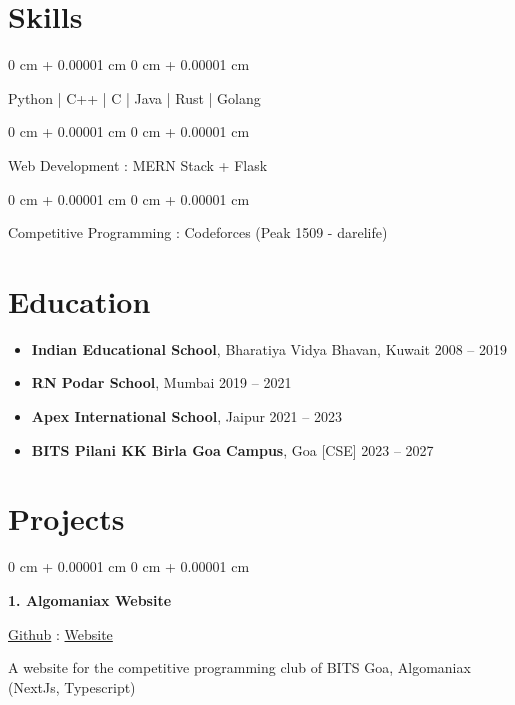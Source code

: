 \documentclass[10pt, letterpaper]{article}
\newenvironment{onecolentry}{
    \begin{adjustwidth}{
        0 cm + 0.00001 cm
    }{
        0 cm + 0.00001 cm
    }
}{
    \end{adjustwidth}
}
\newenvironment{twocolentry}[2][]{
    \onecolentry
    \def\secondColumn{#2}
    \setcolumnwidth{\fill, 4.7 cm} %
    \begin{paracol}{2}
}{
    \switchcolumn \raggedleft \secondColumn
    \end{paracol}
    \endonecolentry
}
\begin{document}
    \section{Skills}
        \begin{onecolentry}
            Python | C++ | C | Java | Rust | Golang
        \end{onecolentry}
        \vspace{0.15cm} %
        \begin{onecolentry}
            Web Development : MERN Stack + Flask
        \end{onecolentry}
        \vspace{0.15cm} %
        \begin{onecolentry}
            Competitive Programming : Codeforces (Peak 1509 - darelife)
        \end{onecolentry}

    \section{Education}
        \begin{itemize}[itemsep=0.2cm] %
            \item \textbf{Indian Educational School}, Bharatiya Vidya Bhavan, Kuwait \hfill 2008 -- 2019
            \item \textbf{RN Podar School}, Mumbai \hfill 2019 -- 2021
            \item \textbf{Apex International School}, Jaipur \hfill 2021 -- 2023
            \item \textbf{BITS Pilani KK Birla Goa Campus}, Goa [CSE] \hfill 2023 -- 2027
        \end{itemize}

    \section{Projects}
        \begin{twocolentry}{
            \href{https://github.com/Darelife/AlgoXXX}{Github} : \href{https://algomaniax.vercel.app/}{Website}
        }
            \textbf{1. Algomaniax Website}
        \end{twocolentry}

        \vspace{0.15 cm} %
        A website for the competitive programming club of BITS Goa, Algomaniax (NextJs, Typescript)
        \vspace{0.3 cm} %
\end{document}
